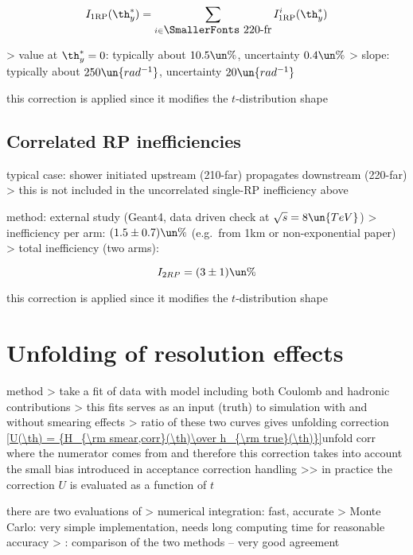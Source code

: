 $$I_{\rm 1RP}(\th_y^*) = \sum\limits_{i \in\hbox{\SmallerFonts 220-fr}} I_{\rm 1RP}^i(\th_y^*)$$

\>> value at $\th_y^* = 0$: typically about $10.5\un{\%}$, uncertainty $0.4\un{\%}$
\>> slope: typically about $250\un{rad^{-1}}$, uncertainty $20\un{rad^{-1}}$

\> this correction is applied since it modifies the $t$-distribution shape



\subsection{Correlated RP inefficiencies}

\> typical case: shower initiated upstream (210-far) propagates downstream (220-far)
\>> this is not included in the uncorrelated single-RP inefficiency above

\> method: external study (Geant4, data driven check at $\sqrt s = 8\un{TeV}$)
\>> inefficiency per arm: $(1.5 \pm 0.7)\un{\%}$ (e.g.~from 1km or non-exponential paper)
\>> total inefficiency (two arms):

$$I_{2RP} = (3 \pm 1)\un{\%}$$

\> this correction is applied since it modifies the $t$-distribution shape



\section{Unfolding of resolution effects}

\> method
\>> take a fit of data with model including both Coulomb and hadronic contributions
\>> this fits serves as an input (truth) to simulation with and without smearing effects
\>> ratio of these two curves gives unfolding correction
\eqref{U(\th) = {H_{\rm smear,corr}(\th)\over h_{\rm true}(\th)}}{unfold corr}
where the numerator comes from  and therefore this correction takes into account the small bias introduced in acceptance correction handling
\>>> in practice the correction $U$ is evaluated as a function of $t$

\> there are two evaluations of 
\>> numerical integration: fast, accurate
\>> Monte Carlo: very simple implementation, needs long computing time for reasonable accuracy
\>>  : comparison of the two methods -- very good agreement

